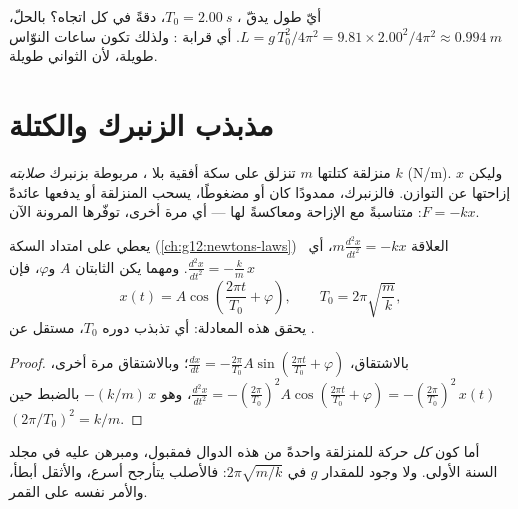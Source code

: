 \begin{example}[نوّاس الثواني]\label{ex:g12:oscillators-and-time:seconds}
أيّ طول يدقّ ، $T_0 = \qty{2.00}{s}$، دقةً في كل
اتجاه؟ بالحلّ، $L = g\,T_0^2/4\pi^2 = 9.81 \times 2.00^2/4\pi^2 \approx
\qty{0.994}{m}$. أي قرابة : ولذلك تكون ساعات النوّاس طويلة،
لأن الثواني طويلة.
\end{example}

\section{مذبذب الزنبرك والكتلة}

\begin{definition}\label{def:g12:oscillators-and-time:spring}
منزلقة كتلتها $m$ تنزلق على سكة أفقية بلا ، مربوطة
بزنبرك \emph{صلابته} $k$ (\unit{N/m}). وليكن
$x$ إزاحتها عن التوازن. فالزنبرك، ممدودًا كان أو مضغوطًا،
يسحب المنزلقة أو يدفعها عائدةً  $F = -kx$:
متناسبةً مع الإزاحة ومعاكسةً لها --- أي 
مرة أخرى، توفّرها المرونة الآن.
\end{definition}

\begin{proposition}\label{prop:g12:oscillators-and-time:spring-period}
يعطي  على امتداد السكة (\cref{ch:g12:newtons-laws})
العلاقة $m \frac{d^2x}{dt^2} = -kx$، أي\ $\frac{d^2x}{dt^2} =
-\frac{k}{m}\,x$. ومهما يكن الثابتان $A$ و$\varphi$، فإن
\[
x(t) = A \cos\!\left(\frac{2\pi t}{T_0} + \varphi\right),
\qquad T_0 = 2\pi\sqrt{\frac{m}{k}},
\]
يحقق هذه المعادلة: أي تذبذب دوره $T_0$، مستقل
عن .
\end{proposition}

\begin{proof}
بالاشتقاق، $\frac{dx}{dt} = -\frac{2\pi}{T_0}A \sin(\frac{2\pi
t}{T_0} + \varphi)$؛ وبالاشتقاق مرة أخرى، $\frac{d^2x}{dt^2} = -(\frac{2\pi}{T_0})^2
A\cos(\frac{2\pi t}{T_0} + \varphi) = -(\frac{2\pi}{T_0})^2\,x(t)$،
وهو $-(k/m)\,x$ بالضبط حين $(2\pi/T_0)^2 = k/m$.
\end{proof}

\begin{remark}\label{rem:g12:oscillators-and-time:uniqueness}
أما كون \emph{كل} حركة للمنزلقة واحدةً من هذه الدوال فمقبول،
ومبرهن عليه في مجلد السنة الأولى. ولا وجود للمقدار $g$ في $2\pi\sqrt{m/k}$:
فالأصلب يتأرجح أسرع، والأثقل أبطأ، والأمر نفسه على القمر.
\end{remark}

